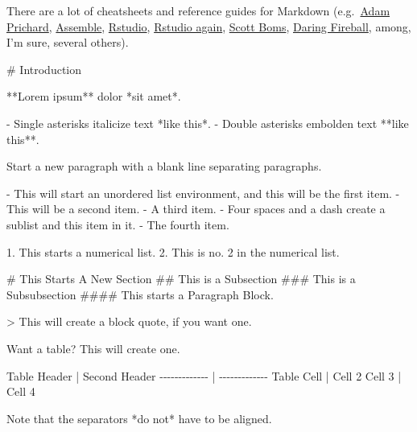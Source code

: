 \documentclass[
  11pt,
]{article}
\newenvironment{Shaded}{\begin{snugshade}}{\end{snugshade}}
\newcommand{\AttributeTok}[1]{\textcolor[rgb]{0.77,0.63,0.00}{#1}}
\newcommand{\FunctionTok}[1]{\textcolor[rgb]{0.00,0.00,0.00}{#1}}
\newcommand{\NormalTok}[1]{#1}
\newcommand{\SpecialStringTok}[1]{\textcolor[rgb]{0.31,0.60,0.02}{#1}}
\begin{document}
There are a lot of cheatsheets and reference guides for Markdown
(e.g.~\href{https://github.com/adam-p/markdown-here/wiki/Markdown-Cheatsheet}{Adam
Prichard},
\href{http://assemble.io/docs/Cheatsheet-Markdown.html}{Assemble},
\href{https://www.rstudio.com/wp-content/uploads/2015/02/rmarkdown-cheatsheet.pdf}{Rstudio},
\href{https://www.rstudio.com/wp-content/uploads/2015/03/rmarkdown-reference.pdf}{Rstudio
again},
\href{http://scottboms.com/downloads/documentation/markdown_cheatsheet.pdf}{Scott
Boms}, \href{https://daringfireball.net/projects/markdown/syntax}{Daring
Fireball}, among, I'm sure, several others).

\begin{Shaded}
\begin{Highlighting}[]

\FunctionTok{\# Introduction}

\NormalTok{**Lorem ipsum** dolor *sit amet*. }

\SpecialStringTok{{-} }\NormalTok{Single asterisks italicize text *like this*. }
\SpecialStringTok{{-} }\NormalTok{Double asterisks embolden text **like this**.}

\NormalTok{Start a new paragraph with a blank line separating paragraphs.}

\SpecialStringTok{{-} }\NormalTok{This will start an unordered list environment, and this will be the first item.}
\SpecialStringTok{{-} }\NormalTok{This will be a second item.}
\SpecialStringTok{{-} }\NormalTok{A third item.}
\SpecialStringTok{    {-} }\NormalTok{Four spaces and a dash create a sublist and this item in it.}
\SpecialStringTok{{-} }\NormalTok{The fourth item.}
    
\SpecialStringTok{1. }\NormalTok{This starts a numerical list.}
\SpecialStringTok{2. }\NormalTok{This is no. 2 in the numerical list.}
    
\FunctionTok{\# This Starts A New Section}
\FunctionTok{\#\# This is a Subsection}
\FunctionTok{\#\#\# This is a Subsubsection}
\FunctionTok{\#\#\#\# This starts a Paragraph Block.}

\AttributeTok{\textgreater{} This will create a block quote, if you want one.}

\NormalTok{Want a table? This will create one.}

\NormalTok{Table Header  | Second Header}
\NormalTok{{-}{-}{-}{-}{-}{-}{-}{-}{-}{-}{-}{-}{-} | {-}{-}{-}{-}{-}{-}{-}{-}{-}{-}{-}{-}{-}}
\NormalTok{Table Cell    | Cell 2}
\NormalTok{Cell 3        | Cell 4 }

\NormalTok{Note that the separators *do not* have to be aligned.}


\end{Highlighting}
\end{Shaded}
\end{document}
